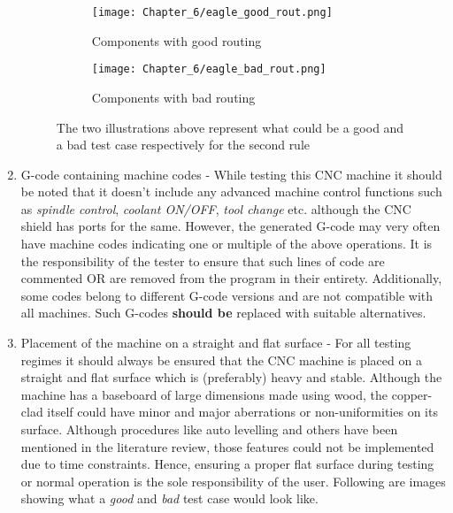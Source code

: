 \begin{enumerate}
       \begin{figure}[h]

        \begin{subfigure}{0.5\textwidth}
         \hspace{8mm}
         \texttt{[image: Chapter\_6/eagle\_good\_rout.png]}
         \caption{Components with good routing}
         \label{fig:grout}
        \end{subfigure}
        \begin{subfigure}{0.5\textwidth}
         \hspace{8mm}
         \texttt{[image: Chapter\_6/eagle\_bad\_rout.png]}
         \caption{Components with bad routing}
         \label{fig:brout}
        \end{subfigure}

        \caption{The two illustrations above represent what could be a good and a bad test case respectively for the second rule}
        \label{fig:gbrout}
       \end{figure}

 \item G-code containing machine codes - While testing this CNC machine it should be noted that it doesn’t include any advanced machine control functions such as \textit{spindle control}, \textit{coolant ON/OFF}, \textit{tool change} etc. although the CNC shield has ports for the same. However, the generated G-code may very often have machine codes indicating one or multiple of the above operations. It is the responsibility of the tester to ensure that such lines of code are commented OR are removed from the program in their entirety. Additionally, some codes belong to different G-code versions and are not compatible with all machines. Such G-codes \textbf{should be} replaced with suitable alternatives.

 \item Placement of the machine on a straight and flat surface - For all testing regimes it should always be ensured that the CNC machine is placed on a straight and flat surface which is (preferably) heavy and stable. Although the machine has a baseboard of large dimensions made using wood, the copper-clad itself could have minor and major aberrations or non-uniformities on its surface. Although procedures like auto levelling and others have been mentioned in the literature review, those features could not be implemented due to time constraints. Hence, ensuring a proper flat surface during testing or normal operation is the sole responsibility of the user. Following are images showing what a \textit{good} and \textit{bad} test case would look like.


\end{enumerate}
